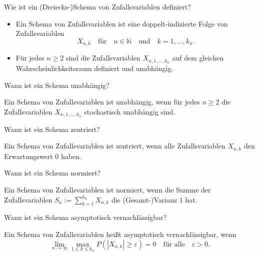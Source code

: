 \begin{QandA}
    \item Wie ist ein (Dreiecks-)Schema von Zufallsvariablen definiert?
    \begin{answered}
        \begin{itemize}
            \item Ein Schema von Zufallsvariablen ist eine doppelt-indizierte Folge von Zufallsvariablen
                  \[
                      X_{n,k} \quad \text{für} \quad n \in \mathbb{N} \quad \text{und} \quad k = 1, \ldots, k_n.
                  \]
            \item Für jedes $n \geq 2$ sind die Zufallsvariablen $X_{n,1, \ldots, k_n}$ auf dem gleichen Wahrscheinlichkeitsraum definiert und unabhängig.
        \end{itemize}
    \end{answered}

    \item Wann ist ein Schema unabhängig?
    \begin{answered}
        Ein Schema von Zufallsvariablen ist unabhängig, wenn für jedes $n \geq 2$ die Zufallsvariablen $X_{n,1, \ldots, k_n}$ stochastisch unabhängig sind.
    \end{answered}

    \item Wann ist ein Schema zentriert?
    \begin{answered}
        Ein Schema von Zufallsvariablen ist zentriert, wenn alle Zufallsvariablen $X_{n,k}$ den Erwartungswert $0$ haben.
    \end{answered}

    \item Wann ist ein Schema normiert?
    \begin{answered}
        Ein Schema von Zufallsvariablen ist normiert, wenn die Summe der Zufallsvariablen $S_n := \sum_{k=1}^{k_n} X_{n,k}$ die (Gesamt-)Varianz $1$ hat.
    \end{answered}

    \item Wann ist ein Schema asymptotisch vernachlässigbar?
    \begin{answered}
        Ein Schema von Zufallsvariablen heißt asymptotisch vernachlässigbar, wenn
        \[
            \lim_{n \to \infty} \max_{1 \leq k \leq k_n} P(|X_{n,k}| \geq \varepsilon) = 0 \quad \text{für alle} \quad \varepsilon > 0.
        \]
    \end{answered}
\end{QandA}

